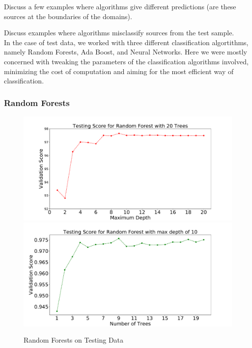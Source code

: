 Discuss a few examples where algorithms give different predictions (are these sources at the boundaries of the domains).

Discuss examples where algorithms misclassify sources from the test sample.\\


In the case of test data, we worked with three different classification algortithms, namely Random Forests, Ada Boost, and Neural Networks. Here we were mostly concerned with tweaking the parameters of the classification algorithms involved, minimizing the cost of computation and aiming for the most efficient way of classification. \\

\subsubsection{Random Forests}


\begin{figure}[h]
\includegraphics[width=\twopicsp\textwidth]{plots/depthvsscore_rf_10seeds_20trees.pdf} \\
\includegraphics[width=\twopicsp\textwidth]{plots/treesvsscore_RF_10seeds_10maxdepth}
\caption{
Random Forests on Testing Data
}
\label{fig:Maps_data}
\end{figure}

